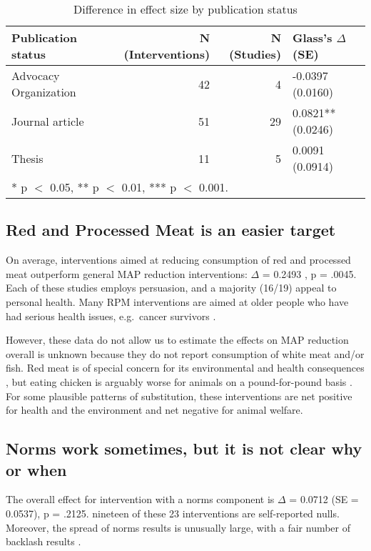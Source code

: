 \documentclass[sn-nature,pdflatex]{sn-jnl}
\begin{document}
\begin{table}[!h]
\centering
\caption{\label{tab:tab:table_two}Difference in effect size by publication status}
\centering
\begin{tabular}[t]{lrrl}
\toprule
Publication status & N (Interventions) & N (Studies) & Glass's $\Delta$ (SE)\\
\midrule
Advocacy Organization & 42 & 4 & -0.0397 (0.0160)\\
Journal article & 51 & 29 & 0.0821** (0.0246)\\
Thesis & 11 & 5 & 0.0091 (0.0914)\\
\bottomrule
\multicolumn{4}{l}{\rule{0pt}{1em}* p $<$ 0.05, ** p $<$ 0.01, *** p $<$ 0.001.}\\
\end{tabular}
\end{table}

\subsection{Red and Processed Meat is an easier
target}\label{red-and-processed-meat-is-an-easier-target}

On average, interventions aimed at reducing consumption of red and
processed meat outperform general MAP reduction interventions:
\(\Delta\) = 0.2493 , p = .0045. Each of these
studies employs persuasion, and a majority (16/19) appeal to personal
health. Many RPM interventions are aimed at older people who have had
serious health issues, e.g.~cancer survivors \citep{lee2018, james2015}.

However, these data do not allow us to estimate the effects on MAP
reduction overall is unknown because they do not report consumption of
white meat and/or fish. Red meat is of special concern for its
environmental and health consequences \citep{grummon2023}, but eating
chicken is arguably worse for animals on a pound-for-pound basis
\citep{mathur2022ethical}. For some plausible patterns of substitution,
these interventions are net positive for health and the environment and
net negative for animal welfare.

\subsection{Norms work sometimes, but it is not clear why or
when}\label{norms-work-sometimes-but-it-is-not-clear-why-or-when}

The overall effect for intervention with a norms component is \(\Delta\)
= 0.0712 (SE = 0.0537), p = .2125. nineteen of these 23 interventions
are self-reported nulls. Moreover, the spread of norms results is
unusually large, with a fair number of backlash results
\citep{sparkman2020, mattson2020, griesoph2021}.
\end{document}

